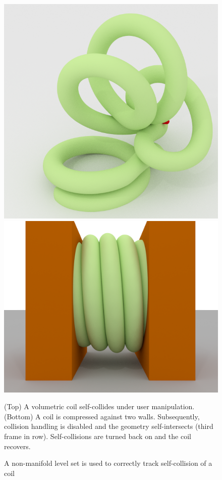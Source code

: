\begin{figure}
{\includegraphics[height=.2\paperheight]{chapter_nonmanifoldlevelsets/images/coil_100.png}
\hfill
\includegraphics[height=.2\paperheight]{chapter_nonmanifoldlevelsets/images/compression_060.png}
}


\caption{A non-manifold level set is used to correctly track
  self-collision of a coil}{(Top) A volumetric coil self-collides
  under user manipulation. (Bottom) A coil is compressed against two
  walls. Subsequently, collision handling is disabled and the geometry
  self-intersects (third frame in row). Self-collisions are turned
  back on and the coil recovers.}
\label{fig:coil}

\end{figure}


